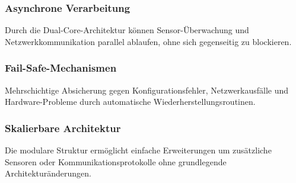 \subsubsection{Asynchrone Verarbeitung}
Durch die Dual-Core-Architektur können Sensor-Überwachung und Netzwerkkommunikation parallel ablaufen, ohne sich gegenseitig zu blockieren.

\subsubsection{Fail-Safe-Mechanismen}
Mehrschichtige Absicherung gegen Konfigurationsfehler, Netzwerkausfälle und Hardware-Probleme durch automatische Wiederherstellungsroutinen.

\subsubsection{Skalierbare Architektur}
Die modulare Struktur ermöglicht einfache Erweiterungen um zusätzliche Sensoren oder Kommunikationsprotokolle ohne grundlegende Architekturänderungen.